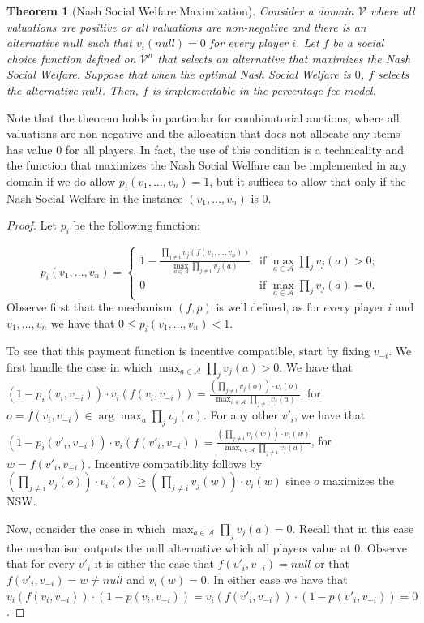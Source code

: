 \documentclass{article}
\newtheorem{theorem}{Theorem}\newtheorem{lemma}[theorem]{Lemma}\newtheorem{proposition}[theorem]{Proposition}\newtheorem{corollary}[theorem]{Corollary}\newtheorem{definition}[theorem]{Definition}\newtheorem{claim}[theorem]{Claim}\newtheorem*{claim*}{Claim}\newenvironment{subproof}{\begin{proof}[Proof of claim]}{\end{proof}}
\newcommand{\cA}{{\mathcal A}}
\begin{document}
\begin{theorem}[Nash Social Welfare Maximization]
\label{thm:VCG}
Consider a domain $\mathcal V$ where all valuations are positive or all valuations are non-negative and there is an alternative $null$ such that $v_i(null)=0$ for every player $i$. Let $f$ be a social choice function defined on $\mathcal V^n$ that selects an alternative that maximizes the Nash Social Welfare. Suppose that when the optimal Nash Social Welfare is $0$, $f$ selects the alternative $null$. Then, $f$ is implementable in the percentage fee model.

\end{theorem}


Note that the theorem holds in particular for combinatorial auctions, where all valuations are non-negative and the allocation that does not allocate any items has value $0$ for all players. In fact, the use of this condition is a technicality and the function that maximizes the Nash Social Welfare can be implemented in any domain if we do allow $p_i(v_1,\ldots, v_n)=1$, but it suffices to allow that only if the Nash Social Welfare in the instance $(v_1,\ldots, v_n)$ is $0$.

\begin{proof}
Let $p_i$ be the following function:

$$
p_i(v_1,\ldots,v_n) = 
\begin{cases}
1 -  \frac{\prod_{j \neq i} v_j(f(v_1,\ldots, v_n))}{\max_{a \in \cA} \prod_{j \neq i} v_j(a)} & \text{if $\max_{a \in \cA} \prod_{j} v_j(a)> 0$};\\
0 & \text{if $\max_{a \in \cA} \prod_{j} v_j(a)= 0$}.
\end{cases}$$
Observe first that the mechanism $(f,p)$ is well defined, as for every player $i$ and $v_1,\ldots, v_n$ we have that $0\leq p_i(v_1,\ldots, v_n)<1$.

To see that this payment function is incentive compatible, start by fixing $v_{-i}$. We first handle the case in which $\max_{a \in \cA} \prod_{j} v_j(a)> 0$. We have that $(1-p_i(v_i, v_{-i}))\cdot v_i(f(v_i, v_{-i}))=\frac {\left(\prod_{j\neq i}v_j(o) \right)\cdot v_i(o)} {\max_{a \in \cA} \prod_{j \neq i} v_j(a)}$, for  $o=f(v_i,v_{-i})\in \arg\max_a \prod_{j}v_j(a)$. For any other $v'_i$, we have that $(1-p_i(v'_i, v_{-i}))\cdot v_i(f(v'_i, v_{-i}))=\frac {\left(\prod_{j\neq i}v_j(w) \right)\cdot v_i(w)} {\max_{a \in \cA} \prod_{j \neq i} v_j(a)}$, for $w=f(v'_i,v_{-i})$. Incentive compatibility follows by $\left(\prod_{j\neq i}v_j(o) \right)\cdot v_i(o) \geq \left(\prod_{j\neq i}v_j(w)\right)\cdot v_i(w)$ since $o$ maximizes the NSW. 

Now, consider the case in which $\max_{a \in \cA} \prod_{j} v_j(a)= 0$. Recall that in this case the mechanism outputs the null alternative which all players value at $0$. Observe that for every $v'_i$ it is either the case that $f(v'_i,v_{-i})=null$ or that $f(v'_i,v_{-i})=w\neq null$ and $v_i(w)=0$. In either case we have that $v_i(f(v_i,v_{-i})) \cdot(1-p(v_i,v_{-i}))= v_i(f(v'_i,v_{-i})) \cdot(1-p(v'_i,v_{-i}))=0$.





\end{proof}
\end{document}
